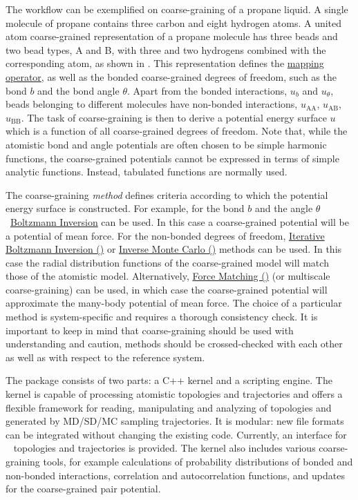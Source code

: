 The workflow can be exemplified on coarse-graining of a propane liquid. A single molecule of propane contains three carbon and eight hydrogen atoms. A united atom coarse-grained representation of a propane molecule has three beads and two bead types, A and B, with three and two hydrogens combined with the corresponding atom, as shown in . This representation defines the \hyperref[sec:mapping_operator]{mapping operator}, as well as the bonded coarse-grained degrees of freedom, such as the bond $b$ and the bond angle $\theta$. Apart from the bonded interactions, $u_b$ and $u_\theta$, beads belonging to different molecules have non-bonded interactions, $u_\text{AA}$, $u_\text{AB}$, $u_\text{BB}$. The task of coarse-graining is then to derive a potential energy surface $u$ which is a function of all coarse-grained degrees of freedom. Note that, while the atomistic bond and angle potentials are often chosen to be simple harmonic functions, the coarse-grained potentials cannot be expressed in terms of simple analytic functions. Instead, tabulated functions are normally used.

The coarse-graining {\em method} defines criteria according to which the potential energy surface is constructed. For example, for the bond $b$ and the angle $\theta$~\hyperref[sec:bi]{Boltzmann Inversion} can be used. In this case a coarse-grained potential will be a potential of mean force. For the non-bonded degrees of freedom,
\hyperref[sec:ibi]{Iterative Boltzmann Inversion (\ibi)} or \hyperref[sec:imc]{Inverse Monte Carlo (\imc)} methods can be used. In this case the radial distribution functions of the coarse-grained model will match those of the atomistic model. Alternatively, \hyperref[sec:fm]{Force Matching (\fm)} (or multiscale coarse-graining) can be used, in which case the coarse-grained potential will approximate the many-body potential of mean force. The choice of a particular method is system-specific and requires a thorough consistency check. It is important to keep in mind that coarse-graining should be used with understanding and caution, methods should be crossed-checked with each other as well as with respect to the reference system.

The package consists of two parts: a C++ kernel and a scripting engine. The kernel is capable of processing atomistic topologies and trajectories and offers a flexible framework for reading, manipulating and analyzing of topologies and generated by MD/SD/MC sampling trajectories. It is modular: new file formats can be integrated without changing the existing code. Currently, an interface for \gromacs~\cite{gromacs4} topologies and trajectories is provided.
%
The kernel also includes various coarse-graining tools, for example calculations of probability distributions of bonded and non-bonded interactions, correlation and autocorrelation functions, and updates for the coarse-grained pair potential.

